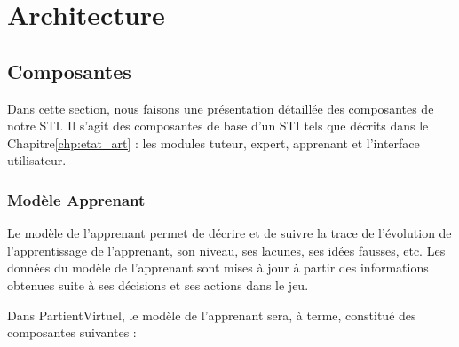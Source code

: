 
\chapter{Architecture}
\label{chp:models}


\section{Composantes}

Dans cette section, nous faisons une présentation détaillée des composantes de notre STI. Il s'agit des composantes de base d'un STI tels que décrits dans le Chapitre\ref{chp:etat_art} : les modules tuteur, expert, apprenant et l'interface utilisateur.




    \subsection{Modèle Apprenant}   
 Le modèle de l'apprenant permet de décrire et de suivre la trace de l'évolution de l'apprentissage de l'apprenant, son niveau, ses lacunes, ses idées fausses, etc. Les données du modèle de l'apprenant sont mises à jour à partir des informations obtenues suite à ses décisions et ses actions dans le jeu.
 
  Dans PartientVirtuel, le modèle de l'apprenant sera, à terme, constitué des composantes suivantes :
 
